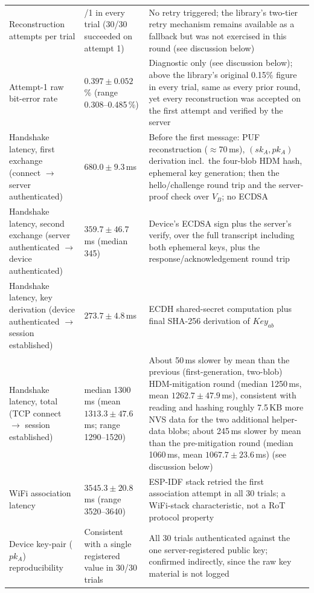 \documentclass[preprint,12pt,authoryear]{elsarticle}
\begin{document}
\begin{longtable}{
    >{\raggedright\arraybackslash}p{4.6cm}
    >{\centering\arraybackslash}p{2.7cm}
    >{\raggedright\arraybackslash}p{4.9cm}
}
        Reconstruction attempts per trial & 1/1 in every trial (30/30 succeeded on attempt 1) & No retry triggered; the library's two-tier retry mechanism remains available as a fallback but was not exercised in this round (see discussion below) \\
        Attempt-1 raw bit-error rate & $0.397 \pm 0.052$\,\% (range 0.308--0.485\,\%) & Diagnostic only (see discussion below); above the library's original 0.15\% figure in every trial, same as every prior round, yet every reconstruction was accepted on the first attempt and verified by the server \\
        Handshake latency, first exchange (connect $\rightarrow$ server authenticated) & $680.0 \pm 9.3$\,ms & Before the first message: PUF reconstruction ($\approx$70\,ms), $(sk_A, pk_A)$ derivation incl.\ the four-blob HDM hash, ephemeral key generation; then the hello/challenge round trip and the server-proof check over $V_B$; no ECDSA \\
        Handshake latency, second exchange (server authenticated $\rightarrow$ device authenticated) & $359.7 \pm 46.7$\,ms (median 345) & Device's ECDSA sign plus the server's verify, over the full transcript including both ephemeral keys, plus the response/acknowledgement round trip \\
        Handshake latency, key derivation (device authenticated $\rightarrow$ session established) & $273.7 \pm 4.8$\,ms & ECDH shared-secret computation plus final SHA-256 derivation of $Key_{ab}$ \\
        Handshake latency, total (TCP connect $\rightarrow$ session established) & median 1300\,ms (mean $1313.3 \pm 47.6$\,ms; range 1290--1520) & About 50\,ms slower by mean than the previous (first-generation, two-blob) HDM-mitigation round (median 1250\,ms, mean $1262.7\pm47.9$\,ms), consistent with reading and hashing roughly 7.5\,KB more NVS data for the two additional helper-data blobs; about 245\,ms slower by mean than the pre-mitigation round (median 1060\,ms, mean $1067.7\pm23.6$\,ms) (see discussion below) \\
        WiFi association latency & $3545.3 \pm 20.8$\,ms (range 3520--3640) & ESP-IDF stack retried the first association attempt in all 30 trials; a WiFi-stack characteristic, not a RoT protocol property \\
        Device key-pair ($pk_A$) reproducibility & Consistent with a single registered value in 30/30 trials & All 30 trials authenticated against the one server-registered public key; confirmed indirectly, since the raw key material is not logged \\
\end{longtable}
\endgroup
\end{document}
